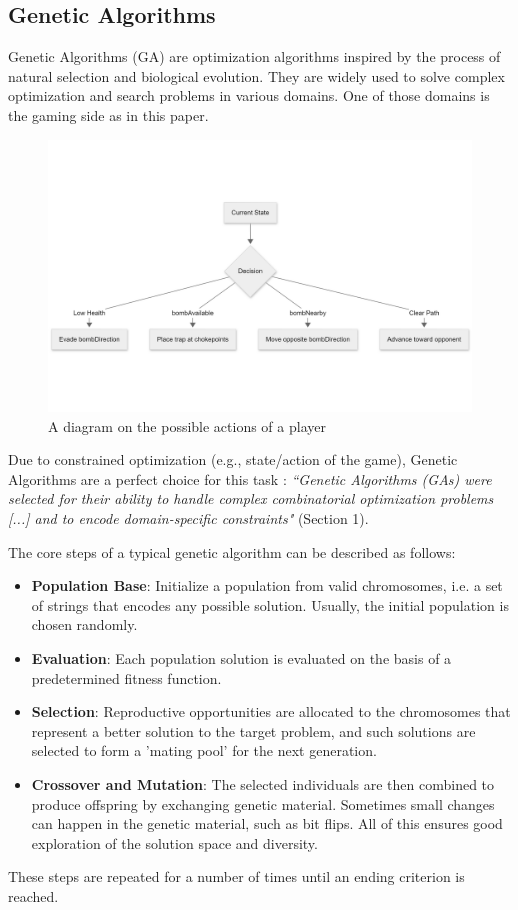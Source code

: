 \documentclass[sigconf]{acmart} %
\begin{document}
\subsection{Genetic Algorithms}
Genetic Algorithms (GA) are optimization algorithms inspired by the process of natural selection and biological evolution. They are widely used to solve complex optimization and search problems in various domains. 
One of those domains is the gaming side as in this paper. 
\begin{figure}
      \centering
      \includegraphics[width = 1\linewidth]{pictures/possibleActionsPlayer.png}
      \caption{\label{fig:possibleActionsPlayer}A diagram on the possible actions of a player}
      \end{figure}
Due to constrained optimization (e.g., state/action of the game), Genetic Algorithms are a perfect choice for this task \cite{popescu2025}: 
\textit{``Genetic Algorithms (GAs) were selected for their ability to handle complex combinatorial optimization problems [...] and to encode domain-specific constraints"} (Section 1).

The core steps of a typical genetic algorithm can be described as follows:
\begin{itemize}
    \item \textbf{Population Base}: Initialize a population from valid chromosomes, i.e. a set of strings that encodes any possible solution. Usually, the initial population is chosen randomly.
    \item \textbf{Evaluation}: Each population solution is evaluated on the basis of a predetermined fitness function.
    \item \textbf{Selection}: Reproductive opportunities are allocated to the chromosomes that represent a better solution to the target problem, and such solutions are selected to form a 'mating pool' for the next generation.
    \item \textbf{Crossover and Mutation}: The selected individuals are then combined to produce offspring by exchanging genetic material. Sometimes small changes can happen in the genetic material, such as bit flips. All of this ensures good exploration of the solution space and diversity.
    
\end{itemize}
These steps are repeated for a number of times until an ending criterion is reached.
\end{document}

